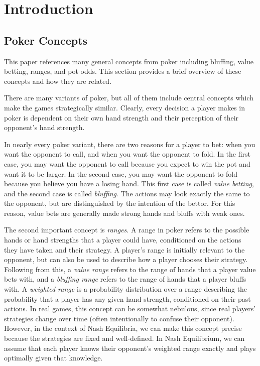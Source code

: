 \documentclass[../../main/main.tex]{subfiles}
\begin{document}
\section{Introduction}


\subsection{Poker Concepts}

This paper references many general concepts from poker including bluffing, value betting, ranges, and pot odds. This section provides a brief overview of these concepts and how they are related.

There are many variants of poker, but all of them include central concepts which make the games strategically similar. Clearly, every decision a player makes in poker is dependent on their own hand strength and their perception of their opponent's hand strength. 

In nearly every poker variant, there are two reasons for a player to bet: when you want the opponent to call, and when you want the opponent to fold. In the first case, you may want the opponent to call because you expect to win the pot and want it to be larger. In the second case, you may want the opponent to fold because you believe you have a losing hand. This first case is called \textit{value betting}, and the second case is called \textit{bluffing}. The actions may look exactly the same to the opponent, but are distinguished by the intention of the bettor. For this reason, value bets are generally made strong hands and bluffs with weak ones.

The second important concept is \textit{ranges}. A range in poker refers to the possible hands or hand strengths that a player could have, conditioned on the actions they have taken and their strategy. A player's range is initially relevant to the opponent, but can also be used to describe how a player chooses their strategy. Following from this, a \textit{value range} refers to the range of hands that a player value bets with, and a \textit{bluffing range} refers to the range of hands that a player bluffs with. A \textit{weighted range} is a probability distribution over a range describing the probability that a player has any given hand strength, conditioned on their past actions. In real games, this concept can be somewhat nebulous, since real players' strategies change over time (often intentionally to confuse their opponent). However, in the context of Nash Equilibria, we can make this concept precise because the strategies are fixed and well-defined. In Nash Equilibrium, we can assume that each player knows their opponent's weighted range exactly and plays optimally given that knowledge. 
\end{document}
